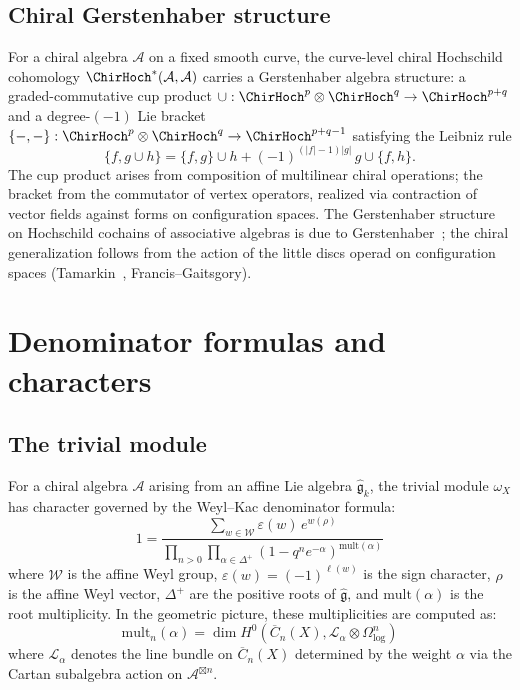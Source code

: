 \subsection{Chiral Gerstenhaber structure}

\begin{theorem}\label{thm:chiral-gerstenhaber}
For a chiral algebra $\mathcal A$ on a fixed smooth curve, the
curve-level chiral Hochschild cohomology
$\ChirHoch^*(\mathcal{A}, \mathcal{A})$
carries a Gerstenhaber algebra structure: a graded-commutative cup product
$\cup: \ChirHoch^p \otimes \ChirHoch^q \to \ChirHoch^{p+q}$ and a degree-$(-1)$ Lie bracket
$\{-,-\}: \ChirHoch^p \otimes \ChirHoch^q
\to \ChirHoch^{p+q-1}$ satisfying the Leibniz
rule
\[
\{f, g \cup h\} = \{f, g\} \cup h
 + (-1)^{(|f|-1)|g|}\, g \cup \{f, h\}.
\]
The cup product arises from composition of multilinear chiral operations;
the bracket from the commutator of vertex operators, realized via
contraction of vector fields against forms on configuration spaces.
The Gerstenhaber structure on Hochschild cochains of associative algebras
is due to Gerstenhaber~\cite{Ger63}; the chiral generalization follows
from the action of the little discs operad on configuration spaces
(Tamarkin~\cite{Tamarkin00}, Francis--Gaitsgory).
\end{theorem}

\section{Denominator formulas and characters}\label{sec:denominator-formulas}

\subsection{The trivial module}

\begin{theorem}\label{thm:weyl-kac-denominator}
For a chiral algebra $\mathcal{A}$ arising from an affine Lie algebra $\hat{\mathfrak{g}}_k$, the trivial module $\omega_X$ has character governed by the Weyl--Kac denominator formula:
\[
1 = \frac{\sum_{w \in \mathcal{W}} \varepsilon(w)\, e^{w(\rho)}}{\prod_{n > 0} \prod_{\alpha \in \Delta^+} (1 - q^n e^{-\alpha})^{\mathrm{mult}(\alpha)}}
\]
where $\mathcal{W}$ is the affine Weyl group, $\varepsilon(w) = (-1)^{\ell(w)}$ is the sign character, $\rho$ is the affine Weyl vector, $\Delta^+$ are the positive roots of $\hat{\mathfrak{g}}$, and $\mathrm{mult}(\alpha)$ is the root multiplicity. In the geometric picture, these multiplicities are computed as:
\[
\mathrm{mult}_n(\alpha) = \dim H^0(\overline{C}_n(X), \mathcal{L}_\alpha \otimes \Omega^n_{\log})
\]
where $\mathcal{L}_\alpha$ denotes the line bundle on $\overline{C}_n(X)$ determined by the weight $\alpha$ via the Cartan subalgebra action on $\mathcal{A}^{\boxtimes n}$.
\end{theorem}

